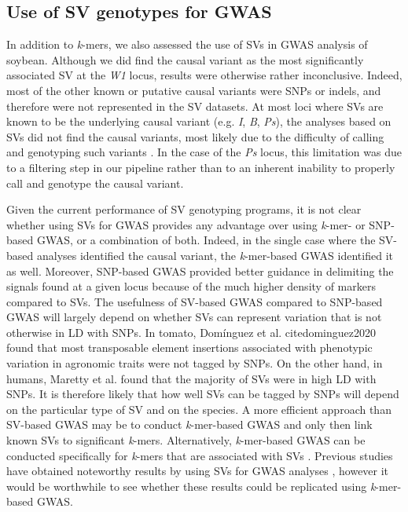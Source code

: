 \documentclass[doublespacing]{bmcart}
\begin{document}
\subsection*{Use of SV genotypes for GWAS}

In addition to \emph{k}-mers, we also assessed the use of SVs in GWAS analysis
of soybean.  Although we did find the causal variant as the most significantly
associated SV at the \emph{W1} locus, results were otherwise rather
inconclusive.  Indeed, most of the other known or putative causal variants were
SNPs or indels, and therefore were not represented in the SV datasets. At most
loci where SVs are known to be the underlying causal variant (e.g.  \emph{I},
\emph{B}, \emph{Ps}), the analyses based on SVs did not find the causal
variants, most likely due to the difficulty of calling and genotyping such
variants \citep{kosugi2019, lemay2022}. In the case of the \textit{Ps} locus,
this limitation was due to a filtering step in our pipeline rather than to an
inherent inability to properly call and genotype the causal variant.

Given the current performance of SV genotyping programs, it is not clear
whether using SVs for GWAS provides any advantage over using \emph{k}-mer- or
SNP-based GWAS, or a combination of both.  Indeed, in the single case where the
SV-based analyses identified the causal variant, the \emph{k}-mer-based GWAS
identified it as well. Moreover, SNP-based GWAS provided better guidance
in delimiting the signals found at a given locus because of the much higher
density of markers compared to SVs.  The usefulness of SV-based GWAS compared
to SNP-based GWAS will largely depend on whether SVs can represent variation
that is not otherwise in LD with SNPs. In tomato, Domínguez et al. cite{dominguez2020} found
that most transposable element insertions associated with phenotypic variation
in agronomic traits were not tagged by SNPs. On the other hand, in humans,
Maretty et al. \cite{maretty2017} found that the majority of SVs were in high LD with SNPs. It
is therefore likely that how well SVs can be tagged by SNPs will depend on the
particular type of SV and on the species. A more efficient approach than
SV-based GWAS may be to conduct \emph{k}-mer-based GWAS and only then link
known SVs to significant \emph{k}-mers.  Alternatively, \textit{k}-mer-based
GWAS can be conducted specifically for \textit{k}-mers that are associated with
SVs \citep{jayakodi2020}.  Previous studies have obtained noteworthy results by
using SVs for GWAS analyses \citep[e.g.][]{zhang2015, akakpo2020,
dominguez2020}, however it would be worthwhile to see whether these results
could be replicated using \emph{k}-mer-based GWAS.
\end{document}

